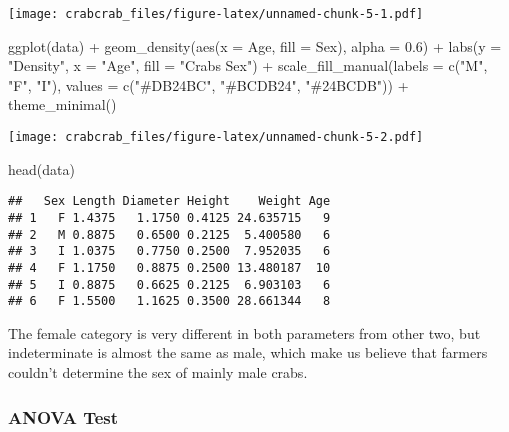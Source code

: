 \documentclass[
]{article}
\newenvironment{Shaded}{\begin{snugshade}}{\end{snugshade}}
\newcommand{\AttributeTok}[1]{\textcolor[rgb]{0.77,0.63,0.00}{#1}}
\newcommand{\FloatTok}[1]{\textcolor[rgb]{0.00,0.00,0.81}{#1}}
\newcommand{\FunctionTok}[1]{\textcolor[rgb]{0.00,0.00,0.00}{#1}}
\newcommand{\NormalTok}[1]{#1}
\newcommand{\SpecialCharTok}[1]{\textcolor[rgb]{0.00,0.00,0.00}{#1}}
\newcommand{\StringTok}[1]{\textcolor[rgb]{0.31,0.60,0.02}{#1}}
\begin{document}
\texttt{[image: crabcrab\_files/figure-latex/unnamed-chunk-5-1.pdf]}

\begin{Shaded}
\begin{Highlighting}[]
\FunctionTok{ggplot}\NormalTok{(data) }\SpecialCharTok{+}
    \FunctionTok{geom\_density}\NormalTok{(}\FunctionTok{aes}\NormalTok{(}\AttributeTok{x =}\NormalTok{ Age, }\AttributeTok{fill =}\NormalTok{ Sex), }\AttributeTok{alpha =} \FloatTok{0.6}\NormalTok{) }\SpecialCharTok{+}
    \FunctionTok{labs}\NormalTok{(}\AttributeTok{y =} \StringTok{"Density"}\NormalTok{, }\AttributeTok{x =} \StringTok{"Age"}\NormalTok{, }\AttributeTok{fill =} \StringTok{"Crabs\textquotesingle{} Sex"}\NormalTok{) }\SpecialCharTok{+}
    \FunctionTok{scale\_fill\_manual}\NormalTok{(}\AttributeTok{labels =} \FunctionTok{c}\NormalTok{(}\StringTok{"M"}\NormalTok{, }\StringTok{"F"}\NormalTok{, }\StringTok{"I"}\NormalTok{),}
        \AttributeTok{values =} \FunctionTok{c}\NormalTok{(}\StringTok{"\#DB24BC"}\NormalTok{, }\StringTok{"\#BCDB24"}\NormalTok{, }\StringTok{"\#24BCDB"}\NormalTok{)) }\SpecialCharTok{+}
    \FunctionTok{theme\_minimal}\NormalTok{()}
\end{Highlighting}
\end{Shaded}

\texttt{[image: crabcrab\_files/figure-latex/unnamed-chunk-5-2.pdf]}

\begin{Shaded}
\begin{Highlighting}[]
\FunctionTok{head}\NormalTok{(data)}
\end{Highlighting}
\end{Shaded}

\begin{verbatim}
##   Sex Length Diameter Height    Weight Age
## 1   F 1.4375   1.1750 0.4125 24.635715   9
## 2   M 0.8875   0.6500 0.2125  5.400580   6
## 3   I 1.0375   0.7750 0.2500  7.952035   6
## 4   F 1.1750   0.8875 0.2500 13.480187  10
## 5   I 0.8875   0.6625 0.2125  6.903103   6
## 6   F 1.5500   1.1625 0.3500 28.661344   8
\end{verbatim}

The female category is very different in both parameters from other two,
but indeterminate is almost the same as male, which make us believe that
farmers couldn't determine the sex of mainly male crabs.

\hypertarget{anova-test}{%
\subsubsection{ANOVA Test}\label{anova-test}}
\end{document}
